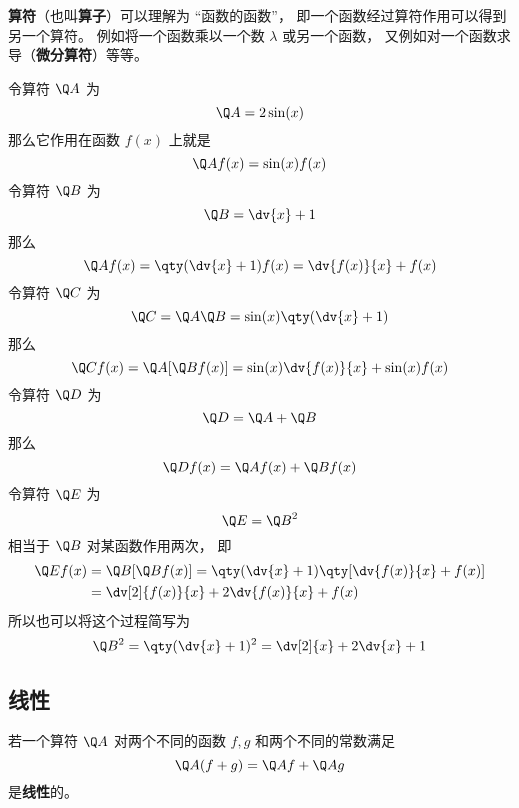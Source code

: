

\textbf{算符}（也叫\textbf{算子}）可以理解为 “函数的函数”， 即一个函数经过算符作用可以得到另一个算符。 例如将一个函数乘以一个数 $\lambda$ 或另一个函数， 又例如对一个函数求导（\textbf{微分算符}）等等。

\begin{example}{}
令算符 $\Q A$ 为
\begin{equation}
\Q A = 2\sin(x)
\end{equation}
那么它作用在函数 $f(x)$ 上就是
\begin{equation}
\Q A f(x) = \sin(x) f(x)
\end{equation}
令算符 $\Q B$ 为
\begin{equation}
\Q B = \dv{x} + 1
\end{equation}
那么
\begin{equation}
\Q A f(x) = \qty(\dv{x} + 1)f(x) = \dv{f(x)}{x} + f(x)
\end{equation}
令算符 $\Q C$ 为
\begin{equation}
\Q C = \Q A \Q B = \sin(x) \qty(\dv{x} + 1)
\end{equation}
那么
\begin{equation}
\Q C f(x) = \Q A [\Q B f(x)] = \sin(x)\dv{f(x)}{x} + \sin(x)f(x)
\end{equation}
令算符 $\Q D$ 为
\begin{equation}
\Q D = \Q A + \Q B
\end{equation}
那么
\begin{equation}
\Q D f(x) = \Q A f(x) + \Q B f(x)
\end{equation}
令算符 $\Q E$ 为
\begin{equation}
\Q E = {\Q B}^2
\end{equation}
相当于 $\Q B$ 对某函数作用两次， 即
\begin{equation}
\begin{aligned}
\Q E f(x) &= \Q B [\Q B f(x)] = \qty(\dv{x} + 1)\qty[\dv{f(x)}{x} + f(x)] \\
&= \dv[2]{f(x)}{x} + 2\dv{f(x)}{x} + f(x)
\end{aligned}
\end{equation}
所以也可以将这个过程简写为
\begin{equation}
\Q B^2 = \qty(\dv{x} + 1)^2 = \dv[2]{x} + 2\dv{x} + 1
\end{equation}
\end{example}

\subsection{线性}
若一个算符 $\Q A$ 对两个不同的函数 $f, g$ 和两个不同的常数满足
\begin{equation}
\Q A (f + g) = \Q A f + \Q A g
\end{equation}
是\textbf{线性}的。
